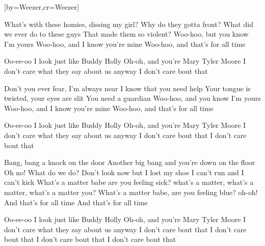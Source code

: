  

[by=Weezer,cr={Weezer}]




\beginverse
What's with these homies, dissing my girl?
Why do they gotta front?
What did we ever do to these guys
That made them so violent?
Woo-hoo, but you know I'm yours
Woo-hoo, and I know you're mine
Woo-hoo, and that's for all time 

Oo-ee-oo I look just like Buddy Holly
Oh-oh, and you're Mary Tyler Moore
I don't care what they say about us anyway
I don't care bout that 

Don't you ever fear, I'm always near
I know that you need help
Your tongue is twisted, your eyes are slit
You need a guardian
Woo-hoo, and you know I'm yours
Woo-hoo, and I know you're mine
Woo-hoo, and that's for all time 

Oo-ee-oo I look just like Buddy Holly
Oh-oh, and you're Mary Tyler Moore
I don't care what they say about us anyway
I don't care bout that
I don't care bout that 

Bang, bang a knock on the door
Another big bang and you're down on the floor
Oh no! What do we do?
Don't look now but I lost my shoe
I can't run and I can't kick
What's a matter babe are you feeling sick?
what's a matter, what's a matter, what's a matter you?
What's a matter babe, are you feeling blue? oh-oh!
And that's for all time
And that's for all time 

Oo-ee-oo I look just like Buddy Holly
Oh-oh, and you're Mary Tyler Moore
I don't care what they say about us anyway
I don't care bout that
I don't care bout that
I don't care bout that
I don't care bout that 
\endverse




\endsong
